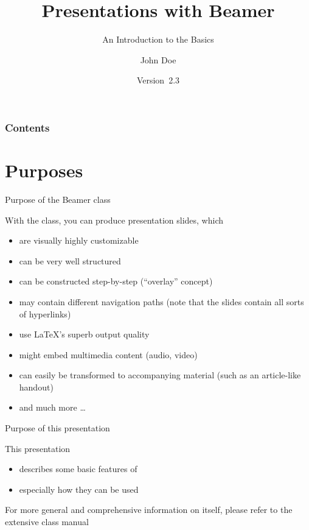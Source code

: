 \documentclass[english]{beamer}
\begin{document}
\title{Presentations with Beamer}

\subtitle{An Introduction to the Basics}

\author{John Doe}

\date{Version~2.3}

\maketitle

\begin{frame}

\frametitle<presentation>{Contents}

\tableofcontents
\end{frame}

\section{Purposes}

\begin{frame}[<+->]{Purpose of the Beamer class}

With the  class, you can produce presentation slides,
which
\begin{itemize}
\item are visually highly customizable
\item can be very well structured
\item can be constructed step-by-step (``overlay'' concept)
\item may contain different navigation paths (note that the slides contain
all sorts of hyperlinks)
\item use \LaTeX 's superb output quality
\item might embed multimedia content (audio, video)
\item can easily be transformed to accompanying material (such as an article-like
handout)
\item and much more \ldots{}
\end{itemize}
\end{frame}

\begin{frame}{Purpose of this presentation}

This presentation
\begin{itemize}[<+->]
\item describes some basic features of 
\item especially how they can be used
\end{itemize}
For more general and comprehensive information on \structure<presentation>{Beamer}
itself, please refer to the extensive class manual \cite{beamer-ug}
\end{frame}
\end{document}
